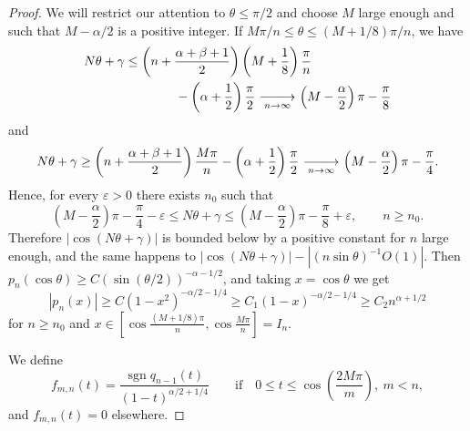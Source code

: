 \documentclass[10pt,a4paper]{article}
\newcommand{\sgn}{\operatorname{sgn}}
\def\hugelimto{\mathop{\,\relbar\joinrel\relbar\joinrel%
  \longrightarrow\,}\limits}
\theoremstyle{plain}
\theoremstyle{remark}
\begin{document}
\begin{proof}
We will restrict our attention to $\theta \leq \pi/2$
and choose $M$ large enough and such that $M-\alpha /2$
is a positive integer.
If $M\pi/n \leq \theta \leq (M+1/8)\pi/n$, we have
\begin{align*}
N\theta+\gamma
&\leq \left(n+ \frac{\alpha+\beta+1}{2}\right)
\left(M+ \frac{1}{8} \right) \frac{\pi}{n} \\
&\qquad\qquad\null- \left(\alpha+ \frac{1}{2} \right) \frac{\pi}{2}
\hugelimto_{n \to \infty} \left(M- \frac{\alpha}{2} \right) \pi
- \frac{\pi}{8}
\end{align*}
and
$$
N\theta+\gamma
\geq \left(n+ \frac{\alpha+\beta+1}{2} \right) \frac{M\pi}{n}
- \left(\alpha+ \frac{1}{2} \right) \frac{\pi}{2}
\hugelimto_{n \to \infty} \left(M- \frac{\alpha}{2} \right) \pi
- \frac{\pi}{4}.
$$
Hence, for every $\varepsilon > 0$ there exists $n_{0}$ such that
$$
\left(M- \frac{\alpha}{2} \right) \pi - \frac{\pi}{4}
- \varepsilon \leq N\theta+\gamma
\leq \left(M- \frac{\alpha}{2} \right) \pi
- \frac{\pi}{8} + \varepsilon,
\qquad n \geq n_{0}.
$$
Therefore $|\cos(N\theta+\gamma)|$
is bounded below by a positive constant for $n$ large enough, and
the same happens to $|\cos(N\theta+\gamma)| - |(n\sin\theta)^{-1}O(1)|$.
Then $p_{n}(\cos\theta) \geq C(\sin(\theta/2))^{-\alpha-1/2}$,
and taking $x = \cos\theta$ we get
\begin{equation}
|p_{n}(x)| \geq C(1-x^{2})^{-\alpha/2-1/4}
\geq C_{1}(1-x)^{-\alpha/2-1/4} \geq C_{2}n^{\alpha+1/2}
\tag{2.10}
\end{equation}
for $n \geq n_{0}$ and
$x \in [\cos \frac{(M+1/8)\pi}{n}, \cos \frac{M\pi}{n}] = I_{n}$.

We define
$$
f_{m,n}(t) = \frac{\sgn q_{n-1}(t)}{(1-t)^{\alpha/2+1/4}}
\qquad\text{if}\quad
0 \leq t \leq \cos \left(\frac{2M\pi}{m} \right),\ m < n,
$$
and $f_{m,n}(t) = 0$ elsewhere.


\end{proof}
\end{document}
